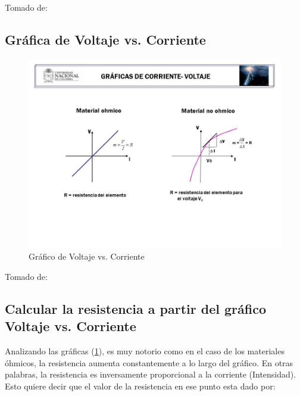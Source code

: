 \documentclass[letterpaper, 12pt]{report}
\begin{document}
\smallskip

Tomado de:~\cite{TemperaturaResistividad}

\subsection{Gráfica de Voltaje vs. Corriente}

\begin{figure}[H]
	\begin{center}
		\includegraphics[scale = 0.5]{./Images/VoltajeVsResistencia.jpg}
		\caption{Gráfico de Voltaje vs. Corriente}
		\label{img:graficoResistencias}
	\end{center}
\end{figure}

Tomado de:~\cite{GraficaVoltajeCorriente}

\subsection{Calcular la resistencia a partir del gráfico Voltaje vs.\hfill{}
	\break{} Corriente}

Analizando las gráficas (\ref{img:graficoResistencias}), es muy notorio como en el caso de los materiales
óhmicos, la resistencia aumenta constantemente a lo largo del gráfico. En
otras palabras, la resistencia es inversamente proporcional a la corriente
(Intensidad). Esto quiere decir que el valor de la resistencia en ese punto
esta dado por:
\end{document}
